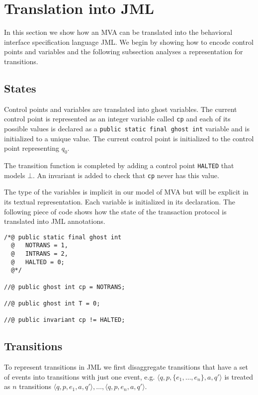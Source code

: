 \documentclass[a4paper,10pt]{article}
\theoremstyle{definition}
\begin{document}
\section{Translation into JML}\label{sec:TransJML}
In this section we show how an MVA can be translated into the behavioral interface specification language JML.
We begin by showing how to encode control points and variables and the following subsection analyses a
representation for transitions.

\subsection*{States}\label{subsec:StatesVar}
Control points and variables are translated into ghost variables.  The current control point is represented as
an integer variable called \texttt{cp} and each of its possible values is declared as a \texttt{public static
final ghost int} variable and is initialized to a unique value. The current control point is initialized to
the control point representing $q_0$.

The transition function is completed by adding a control point \texttt{HALTED} that models $\bot$. An
invariant is added to check that \texttt{cp} never has this value.

The type of the variables is implicit in our model of MVA but will be explicit in its textual representation.
Each variable is initialized in its declaration. The following piece of code shows how the state of the
transaction protocol is translated into JML annotations.

\begin{verbatim}
/*@ public static final ghost int
  @   NOTRANS = 1,
  @   INTRANS = 2,
  @   HALTED = 0;  
  @*/

//@ public ghost int cp = NOTRANS;

//@ public ghost int T = 0;

//@ public invariant cp != HALTED;
\end{verbatim}


\subsection*{Transitions}\label{subsec:Transitions}
To represent transitions in JML we first disaggregate transitions that have a set of events into transitions
with just one event, e.g. $\langle q,p,\{e_1,\ldots,e_n\},a,q' \rangle$ is treated as $n$ transitions $\langle
q,p,e_1,a,q' \rangle, \ldots, \langle q,p,e_n,a,q' \rangle$.
\end{document}
